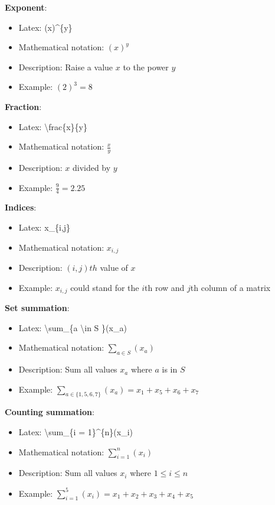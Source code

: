 \documentclass{article}
\let\oldsum\sum
\renewcommand{\sum}{\oldsum\limits}
\newcommand{\mboldescrip}[5]{
\vspace{0.5in}
    \textbf{#1}:
    \begin{itemize}
        \item Latex: #2
        \item Mathematical notation: #3
        \item Description: #4
        \item Example: #5
    \end{itemize}
}
\begin{document}
\mboldescrip{Exponent}{(x)\^{}\{y\}}{$(x)^{y}$}{Raise a value $x$ to the power $y$}{$(2)^{3}=8$}

\mboldescrip{Fraction}{\textbackslash frac\{x\}\{y\}}{$\frac{x}{y}$}{$x$ divided by $y$}{$\frac{9}{4}=2.25$}

\mboldescrip{Indices}{x\_\{i,j\}}{$x_{i,j}$}{$(i,j)th$ value of $x$}{$x_{i,j}$ could stand for the $i$th row and $j$th column of a matrix}

\mboldescrip{Set summation}{\textbackslash sum\_\{a \textbackslash in S \}(x\_a)}{$\sum_{a \in S}(x_a)$}{Sum all values $x_a$ where $a$ is in $S$}{$\sum_{a \in \{1,5,6,7\}}(x_a) = x_1+x_5+x_6+x_7$}

\mboldescrip{Counting summation}{\textbackslash sum\_\{i = 1\}\^{}\{n\}(x\_i)}{$\sum_{i=1}^{n}(x_i)$}{Sum all values $x_i$ where $1 \le i \le n$}{$\sum_{i=1}^{5}(x_i) = x_1+x_2+x_3+x_4+x_5$}
\end{document}
